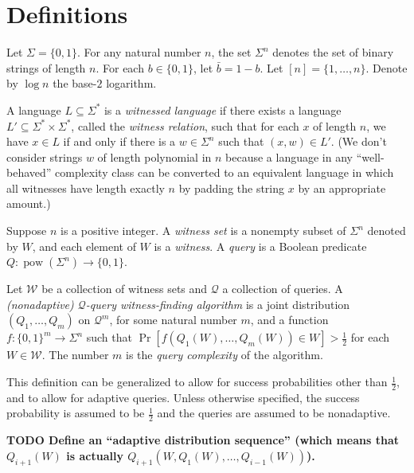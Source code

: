 \documentclass{article}
\newcommand{\todo}[1]{\textbf{TODO #1}}
\newcommand{\mc}{\mathcal}
\DeclareMathOperator{\pow}{pow}
\begin{document}
\section{Definitions}

Let $\Sigma = \{0, 1\}$.
For any natural number $n$, the set $\Sigma^n$ denotes the set of binary strings of length $n$.
For each $b \in \{0, 1\}$, let $\bar{b} = 1 - b$.
Let $[n] = \{1, \dotsc, n\}$.
Denote by $\log n$ the base-$2$ logarithm.

A language $L \subseteq \Sigma^*$ is a \emph{witnessed language} if there exists a language $L' \subseteq \Sigma^* \times \Sigma^*$, called the \emph{witness relation}, such that for each $x$ of length $n$, we have $x \in L$ if and only if there is a $w \in \Sigma^n$ such that $(x, w) \in L'$.
(We don't consider strings $w$ of length polynomial in $n$ because a language in any ``well-behaved'' complexity class can be converted to an equivalent language in which all witnesses have length exactly $n$ by padding the string $x$ by an appropriate amount.)

Suppose $n$ is a positive integer.
A \emph{witness set} is a nonempty subset of $\Sigma^n$ denoted by $W$, and each element of $W$ is a \emph{witness}.
A \emph{query} is a Boolean predicate $Q \colon \pow(\Sigma^n) \to \{0, 1\}$.

\begin{definition}
  Let $\mc{W}$ be a collection of witness sets and $\mc{Q}$ a collection of queries.
  A \emph{(nonadaptive) $\mc{Q}$-query witness-finding algorithm} is a joint distribution $(Q_1, \dotsc, Q_m)$ on $\mc{Q}^m$, for some natural number $m$, and a function $f \colon \{0, 1\}^m \to \Sigma^n$ such that $\Pr[f(Q_1(W), \dotsc, Q_m(W)) \in W] > \frac{1}{2}$ for each $W \in \mc{W}$.
  The number $m$ is the \emph{query complexity} of the algorithm.
\end{definition}

This definition can be generalized to allow for success probabilities other than $\frac{1}{2}$, and to allow for adaptive queries.
Unless otherwise specified, the success probability is assumed to be $\frac{1}{2}$ and the queries are assumed to be nonadaptive.

\todo{Define an ``adaptive distribution sequence'' (which means that $Q_{i + 1}(W)$ is actually $Q_{i + 1}(W, Q_1(W), \dotsc, Q_{i - 1}(W))$).}
\end{document}
